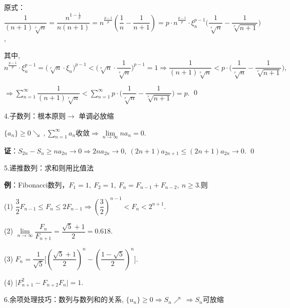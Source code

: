 \documentclass[UTF8]{ctexart}
\numberwithin{equation}{section}
\numberwithin{figure}{section}
\numberwithin{table}{section}
\newcommand\no{\noindent}
\newcommand\dis{\displaystyle}
\newcommand\ls{\leqslant}
\newcommand\gs{\geqslant}
\newcommand\limn{\dis\lim\limits_{n\to\infty}}
\newcommand\sumn{\dis\sum\limits_{n=1}^{\infty}}
\begin{document}
\begin{spacing}{2}
\vspace{0.3cm}

原式：$\dfrac{1}{(n+1)\sqrt[^p\!]{n}}=\dfrac{n^{1-\tfrac{1}{p}}}{n(n+1)}
=n^{\tfrac{p-1}{p}}\left(\dfrac{1}{n}-\dfrac{1}{n+1}\right)
=p\cdot n^{\tfrac{p-1}{p}}\cdot\xi_n^{p-1}\Bigg(\dfrac{1}{\sqrt[^p\!]{n}}-\dfrac{1}{\sqrt[^p\!]{n+1}}\Bigg)$,

\vspace{0.3cm}

其中, $n^{\tfrac{p-1}{p}}\cdot\xi_n^{p-1}=\Big(\sqrt[^p\!]{n}\cdot\xi_n\Big)^{p-1}<
\Bigg(\sqrt[^p\!]{n}\cdot\dfrac{1}{\sqrt[^p\!]{n}}\Bigg)^{p-1}=1
\Longrightarrow\dfrac{1}{(n+1)\sqrt[^p\!]{n}}<p\cdot
\Bigg(\dfrac{1}{\sqrt[^p\!]{n}}-\dfrac{1}{\sqrt[^p\!]{n+1}}\Bigg),$

\vspace{0.3cm}

$\Longrightarrow\sumn\dfrac{1}{(n+1)\sqrt[^p\!]{n}}
<\sumn p\cdot\Bigg(\dfrac{1}{\sqrt[^p\!]{n}}-\dfrac{1}{\sqrt[^p\!]{n+1}}\Bigg)=p.$
\qed

\vspace{0.3cm}

\no4.子数列：根本原则$\longrightarrow$ \textcolor[rgb]{1,0,0}{单调必放缩}

$\{a_n\}\gs0\searrow\ ,\sumn a_n$收敛$\Longrightarrow\limn na_n=0.$

\textbf{证}：$S_{2n}-S_n\gs na_{2n}\longrightarrow0\Longrightarrow 2na_{2n}
\longrightarrow0,\ (2n+1)a_{2n+1}\ls(2n+1)a_{2n}\longrightarrow0.$
\qed

\no5.递推数列：求和则用比值法

\textbf{例}：Fibonacci数列，$F_1=1,\ F_2=1,\ F_n=F_{n-1}+F_{n-2},\ n\gs3.$则

(1) $\dfrac{3}{2}F_{n-1}\ls F_n\ls2F_{n-1}\Longrightarrow
\left(\dfrac{3}{2}\right)^{n-1}<F_n<2^{n+1}.$

\vspace{0.2cm}

(2) $\limn\dfrac{F_n}{F_{n+1}}=\dfrac{\sqrt{5}+1}{2}=0.618.$

\vspace{0.2cm}

(3) $F_n=\dfrac{1}{\sqrt{5}}\Bigg[\left(\dfrac{\sqrt{5}+1}{2}\right)^n-\left(\dfrac{1-\sqrt{5}}{2}\right)^n\Bigg].$

\vspace{0.2cm}

(4) $\Big|F_{n+1}^2-F_{n+2}F_n\Big|=1.$

\no6.余项处理技巧：数列与数列和的关系, 
$\{u_n\}\gs0\Longrightarrow S_n\nearrow\ \Longrightarrow S_n$可放缩


\end{spacing}
\end{document}
